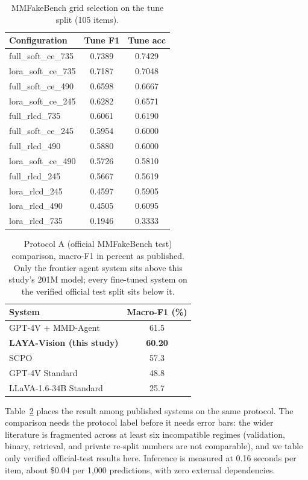 \documentclass[conference]{IEEEtran}
\begin{document}
\begin{table}[t]
\centering
\caption{MMFakeBench grid selection on the tune split (105 items).}
\label{tab:grid}
\begin{tabular}{lcc}
\toprule
Configuration & Tune F1 & Tune acc \\
\midrule
full\_soft\_ce\_735 & 0.7389 & 0.7429 \\
lora\_soft\_ce\_735 & 0.7187 & 0.7048 \\
full\_soft\_ce\_490 & 0.6598 & 0.6667 \\
lora\_soft\_ce\_245 & 0.6282 & 0.6571 \\
full\_rlcd\_735 & 0.6061 & 0.6190 \\
full\_soft\_ce\_245 & 0.5954 & 0.6000 \\
full\_rlcd\_490 & 0.5880 & 0.6000 \\
lora\_soft\_ce\_490 & 0.5726 & 0.5810 \\
full\_rlcd\_245 & 0.5667 & 0.5619 \\
lora\_rlcd\_245 & 0.4597 & 0.5905 \\
lora\_rlcd\_490 & 0.4505 & 0.6095 \\
lora\_rlcd\_735 & 0.1946 & 0.3333 \\
\bottomrule
\end{tabular}
\end{table}

\begin{table}[t]
\centering
\caption{Protocol A (official MMFakeBench test) comparison, macro-F1 in percent as published. Only the frontier agent system sits above this study's 201M model; every fine-tuned system on the verified official test split sits below it.}
\label{tab:protocol}
\begin{tabular}{lc}
\toprule
System & Macro-F1 (\%) \\
\midrule
GPT-4V + MMD-Agent & 61.5 \\
\textbf{LAYA-Vision (this study)} & \textbf{60.20} \\
SCPO & 57.3 \\
GPT-4V Standard & 48.8 \\
LLaVA-1.6-34B Standard & 25.7 \\
\bottomrule
\end{tabular}
\end{table}

Table~\ref{tab:protocol} places the result among published systems on the same protocol. The comparison needs the protocol label before it needs error bars: the wider literature is fragmented across at least six incompatible regimes (validation, binary, retrieval, and private re-split numbers are not comparable), and we table only verified official-test results here. Inference is measured at 0.16 seconds per item, about \$0.04 per 1,000 predictions, with zero external dependencies.
\end{document}
